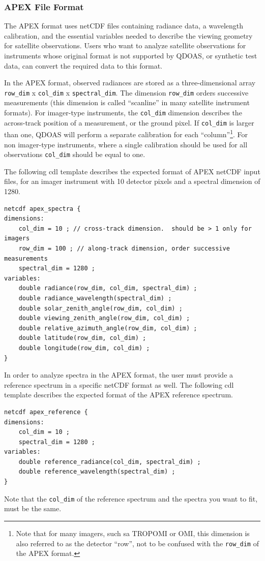 \subsubsection{APEX File Format}\label{sec:apex-file-format}
The APEX format uses netCDF files containing radiance data, a wavelength calibration, and the essential variables needed to describe the viewing geometry for satellite observations.  Users who want to analyze satellite observations for instruments whose original format is not supported by QDOAS, or synthetic test data, can convert the required data to this format.

In the APEX format, observed radiances are stored as a three-dimensional array \texttt{row\_dim} x \texttt{col\_dim} x \texttt{spectral\_dim}.  The dimension \texttt{row\_dim} orders successive measurements (this dimension is called ``scanline'' in many satellite instrument formats).  For imager-type instruments, the \texttt{col\_dim} dimension describes the across-track position of a measurement, or the ground pixel.  If \texttt{col\_dim} is larger than one, QDOAS will perform a separate calibration for each ``column''\footnote{Note that for many imagers, such sa TROPOMI or OMI, this dimension is also referred to as the detector ``row'', not to be confused with the \texttt{row\_dim} of the APEX format.}.  For non imager-type instruments, where a single calibration should be used for all observations \texttt{col\_dim} should be equal to one.

The following cdl template describes the expected format of APEX netCDF input files, for an imager instrument with 10 detector pixels and a spectral dimension of 1280.
\begin{Verbatim}[fontfamily=courier,fontsize=\relsize{-2}]
netcdf apex_spectra {
dimensions:
	col_dim = 10 ; // cross-track dimension.  should be > 1 only for imagers
	row_dim = 100 ; // along-track dimension, order successive measurements
	spectral_dim = 1280 ;
variables:
	double radiance(row_dim, col_dim, spectral_dim) ;
	double radiance_wavelength(spectral_dim) ;
	double solar_zenith_angle(row_dim, col_dim) ;
	double viewing_zenith_angle(row_dim, col_dim) ;
	double relative_azimuth_angle(row_dim, col_dim) ;
	double latitude(row_dim, col_dim) ;
	double longitude(row_dim, col_dim) ;
}
\end{Verbatim}
In order to analyze spectra in the APEX format, the user must provide a reference spectrum in a specific netCDF format as well.  The following cdl template describes the expected format of the APEX reference spectrum.
\begin{Verbatim}[fontfamily=courier,fontsize=\relsize{-2}]
netcdf apex_reference {
dimensions:
	col_dim = 10 ;
	spectral_dim = 1280 ;
variables:
	double reference_radiance(col_dim, spectral_dim) ;
	double reference_wavelength(spectral_dim) ;
}
\end{Verbatim}
Note that the \texttt{col\_dim} of the reference spectrum and the spectra you want to fit, must be the same.

